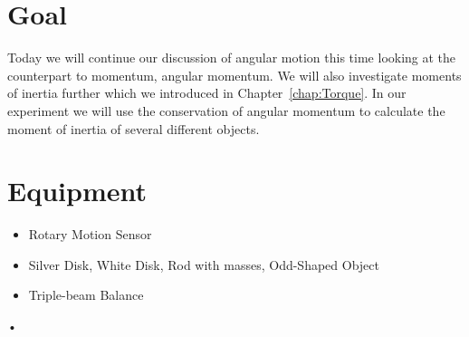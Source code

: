 \documentclass[main.tex]{subfiles}
\begin{document}
\section*{Goal}
Today we will continue our discussion of angular motion this time looking at the counterpart to momentum, angular momentum. We will also investigate moments of inertia further which we introduced in Chapter~\ref{chap:Torque}. In our experiment we will use the conservation of angular momentum to calculate the moment of inertia of several different objects.

\section*{Equipment}
\begin{itemize}
\item
Rotary Motion Sensor
\item
Silver Disk, White Disk, Rod with masses, Odd-Shaped Object
\item
Triple-beam Balance
\end{itemize}•
\end{document}
